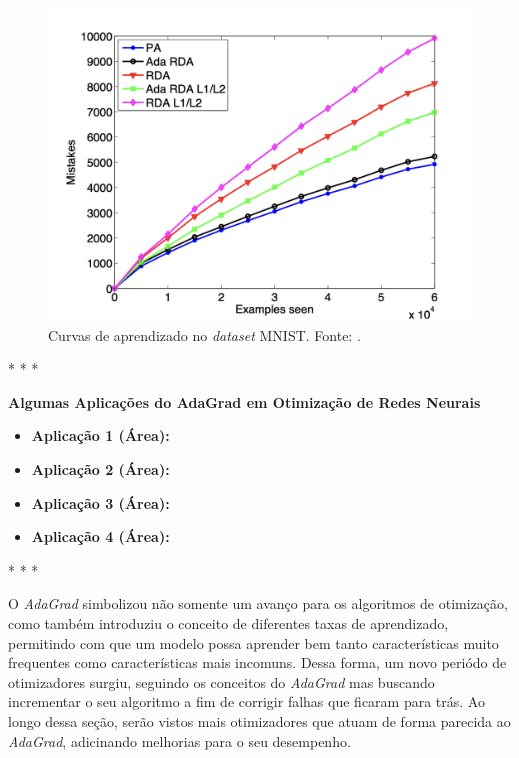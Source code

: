 \begin{figure}[h]
    \centering
    \includegraphics[width=0.65\linewidth]{../imagens/retropropagacao-gradiente/comparativo-adagrad-mnist.png}
    
    \caption[Curvas de aprendizado no MNIST]{%
        Curvas de aprendizado no \textit{dataset} MNIST.
        \newline %
        \small Fonte: \parencite{AdaGradMethod}.
    }
    \label{fig:curvas-de-aprendizado-adagrad-mnist}
\end{figure}

\medskip
\begin{center}
 * * *
\end{center}
\medskip

\textbf{Algumas Aplicações do AdaGrad em Otimização de Redes Neurais}
\vspace{1em}

\begin{itemize}
    \item \textbf{Aplicação 1 (Área):}
    \item \textbf{Aplicação 2 (Área):}
    \item \textbf{Aplicação 3 (Área):}
    \item \textbf{Aplicação 4 (Área):}
\end{itemize}

\medskip
\begin{center}
 * * *
\end{center}
\medskip

O \textit{AdaGrad} simbolizou não somente um avanço para os algoritmos de otimização, como também introduziu o conceito de diferentes taxas de aprendizado, permitindo com que um modelo possa aprender bem tanto características muito frequentes como características mais incomuns. Dessa forma, um novo periódo de otimizadores surgiu, seguindo os conceitos do \textit{AdaGrad} mas buscando incrementar o seu algoritmo a fim de corrigir falhas que ficaram para trás. Ao longo dessa seção, serão vistos mais otimizadores que atuam de forma parecida ao \textit{AdaGrad}, adicinando melhorias para o seu desempenho.

